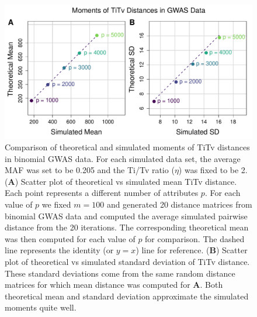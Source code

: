 \documentclass[10pt,letterpaper]{article}\usepackage[]{graphicx}\usepackage[]{color}
\begin{document}
\begin{figure}[H]
	\includegraphics[width=\textwidth]{compared_moments_gwas_titv2.pdf}
	\caption{Comparison of theoretical and simulated moments of TiTv distances in binomial GWAS data. For each simulated data set, the average MAF was set to be 0.205 and the Ti/Tv ratio ($\eta$) was fixed to be 2. (\textbf{A}) Scatter plot of theoretical vs simulated mean TiTv distance. Each point represents a different number of attributes $p$. For each value of $p$ we fixed $m=100$ and generated 20 distance matrices from binomial GWAS data and computed the average simulated pairwise distance from the 20 iterations. The corresponding theoretical mean was then computed for each value of $p$ for comparison. The dashed line represents the identity (or $y=x$) line for reference. (\textbf{B}) Scatter plot of theoretical vs simulated standard deviation of TiTv distance. These standard deviations come from the same random distance matrices for which mean distance was computed for \textbf{A}. Both theoretical mean and standard deviation approximate the simulated moments quite well.}
\end{figure}
\end{document}
